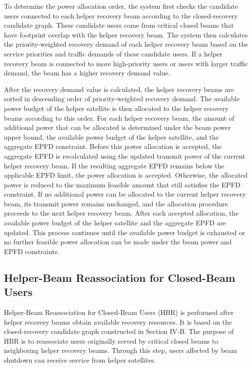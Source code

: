 To determine the power allocation order, the system first checks the candidate users connected to each helper recovery beam according to the closed-recovery candidate graph. These candidate users come from critical closed beams that have footprint overlap with the helper recovery beam. The system then calculates the priority-weighted recovery demand of each helper recovery beam based on the service priorities and traffic demands of these candidate users. If a helper recovery beam is connected to more high-priority users or users with larger traffic demand, the beam has a higher recovery demand value.

After the recovery demand value is calculated, the helper recovery beams are sorted in descending order of priority-weighted recovery demand. The available power budget of the helper satellite is then allocated to the helper recovery beams according to this order. For each helper recovery beam, the amount of additional power that can be allocated is determined under the beam power upper bound, the available power budget of the helper satellite, and the aggregate EPFD constraint. Before this power allocation is accepted, the aggregate EPFD is recalculated using the updated transmit power of the current helper recovery beam. If the resulting aggregate EPFD remains below the applicable EPFD limit, the power allocation is accepted. Otherwise, the allocated power is reduced to the maximum feasible amount that still satisfies the EPFD constraint. If no additional power can be allocated to the current helper recovery beam, its transmit power remains unchanged, and the allocation procedure proceeds to the next helper recovery beam. After each accepted allocation, the available power budget of the helper satellite and the aggregate EPFD are updated. This process continues until the available power budget is exhausted or no further feasible power allocation can be made under the beam power and EPFD constraints.

\subsection{Helper-Beam Reassociation for Closed-Beam Users}
\label{sec:ch4_hbr}
Helper-Beam Reassociation for Closed-Beam Users (HBR) is performed after helper recovery beams obtain available recovery resources. It is based on the closed-recovery candidate graph constructed in Section IV-B. The purpose of HBR is to reassociate users originally served by critical closed beams to neighboring helper recovery beams. Through this step, users affected by beam shutdown can receive service from helper satellites.

